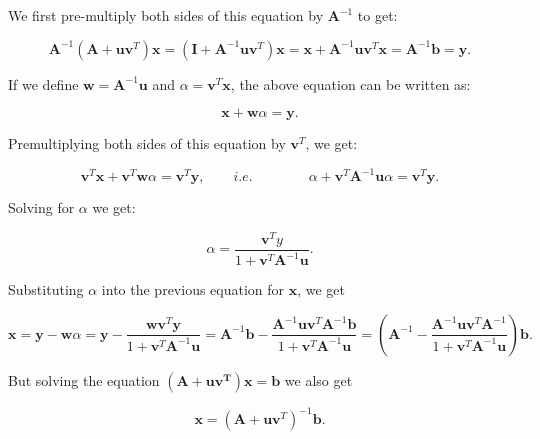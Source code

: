 \documentclass[10pt,b5paper,titlepage]{book}
\begin{document}
We first pre-multiply both sides of this equation by $\mathbf{A}^{-1}$ to get:

\begin{equation}
    \mathbf{A}^{-1}(\mathbf{A} + \mathbf{u}\mathbf{v}^{T})\mathbf{x}
    = (\mathbf{I}+\mathbf{A}^{-1}\mathbf{u}\mathbf{v}^{T})\mathbf{x}
    = \mathbf{x} + \mathbf{A}^{-1}\mathbf{u}\mathbf{v}^{T}\mathbf{x}
    = \mathbf{A}^{-1}\mathbf{b} = \mathbf{y}
.\end{equation}

If we define $\mathbf{w} = \mathbf{A}^{-1}\mathbf{u}$ and $\alpha = \mathbf{v}^{T}\mathbf{x}$,
the above equation can be written as:

\begin{equation}
    \mathbf{x} + \mathbf{w}\alpha = \mathbf{y}
.\end{equation}

Premultiplying both sides of this equation by $\mathbf{v}^{T}$, we get:

\begin{equation}
    \mathbf{v}^{T}\mathbf{x} + \mathbf{v}^{T}\mathbf{w}\alpha
    = \mathbf{v}^{T}\mathbf{y}, \qquad i.e. \qquad
    \qquad \alpha + \mathbf{v}^{T}\mathbf{A}^{-1}\mathbf{u}\alpha
    = \mathbf{v}^{T}\mathbf{y}
.\end{equation}

Solving for $\alpha$ we get:

\begin{equation}
    \alpha = \frac{\mathbf{v}^{T}y}{1+\mathbf{v}^{T}\mathbf{A}^{-1}\mathbf{u}}
.\end{equation}

Substituting $\alpha$ into the previous equation for $\mathbf{x}$, we get

\begin{equation}
    \mathbf{x} = \mathbf{y} - \mathbf{w}\alpha
    = \mathbf{y} - \frac{\mathbf{w}\mathbf{v}^{T}\mathbf{y}}
    {1 + \mathbf{v}^{T}\mathbf{A}^{-1}\mathbf{u}}
    = \mathbf{A}^{-1}\mathbf{b}
    - \frac{\mathbf{A}^{-1}\mathbf{u}\mathbf{v}^{T}\mathbf{A}^{-1}\mathbf{b}}
    {1 + \mathbf{v}^{T}\mathbf{A}^{-1}\mathbf{u}}
    = \left( \mathbf{A}^{-1}
    - \frac{\mathbf{A}^{-1}\mathbf{u}\mathbf{v}^{T}\mathbf{A}^{-1}}
    {1 + \mathbf{v}^{T}\mathbf{A}^{-1}\mathbf{u}}\right) \mathbf{b}
.\end{equation}

But solving the equation $(\mathbf{A + \mathbf{u}\mathbf{v}^{T}})\mathbf{x} = \mathbf{b}$
we also get

\begin{equation}
    \mathbf{x} = (\mathbf{A} + \mathbf{u}\mathbf{v}^{T})^{-1}\mathbf{b}
.\end{equation}
\end{document}
